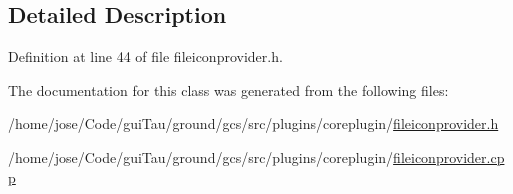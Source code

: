 \subsection{Detailed Description}


Definition at line 44 of file fileiconprovider.\-h.



The documentation for this class was generated from the following files\-:\begin{DoxyCompactItemize}
\item 
/home/jose/\-Code/gui\-Tau/ground/gcs/src/plugins/coreplugin/\hyperlink{fileiconprovider_8h}{fileiconprovider.\-h}\item 
/home/jose/\-Code/gui\-Tau/ground/gcs/src/plugins/coreplugin/\hyperlink{fileiconprovider_8cpp}{fileiconprovider.\-cpp}\end{DoxyCompactItemize}
